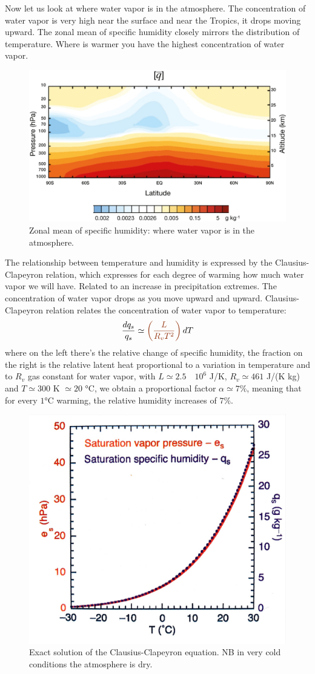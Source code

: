 Now let us look at where water vapor is in the atmosphere. The concentration of water vapor is very high near the surface and near the Tropics, it drops moving upward. The zonal mean of specific humidity closely mirrors the distribution of temperature. Where is warmer you have the highest concentration of water vapor. 
\begin{figure}[htpb]
    \centering
    \includegraphics[width=0.5\linewidth]{uploads/specific humidity.png}
    \caption{Zonal mean of specific humidity: where water vapor is in the atmosphere.}
    \label{fig:specific humidity}
\end{figure}
The relationship between temperature and humidity is expressed by the Clausius-Clapeyron relation, which expresses for each degree of warming how much water vapor we will have. Related to an increase in precipitation extremes. The concentration of water vapor drops as you move upward and upward. Clausius-Clapeyron relation relates the concentration of water vapor to temperature:
\begin{equation}\label{eq:CC eq}
    \frac{dq_s}{q_s}\simeq \color{RawSienna}\left(\frac{L}{R_vT^2}\right)\color{black}dT
\end{equation}
where on the left there's the relative change of specific humidity, the \textcolor{RawSienna}{fraction} on the right is the relative latent heat proportional to a variation in temperature and to $R_v$ gas constant for water vapor, with $L\simeq 2.5 \quad 10^6$ J/K, $R_v\simeq 461$ J/(K kg) and $T\simeq 300$ K $\simeq 20$ °C, we obtain a proportional factor $\alpha \simeq 7\%$, meaning that for every $1$°C warming, the relative humidity increases of $7\%$.
\begin{figure}[htpb]
    \centering
    \includegraphics[width=0.5\linewidth]{uploads/exact CC.png}
    \caption{Exact solution of the Clausius-Clapeyron equation. NB in very cold conditions the atmosphere is dry.}
    \label{fig:exact CC}
\end{figure}

